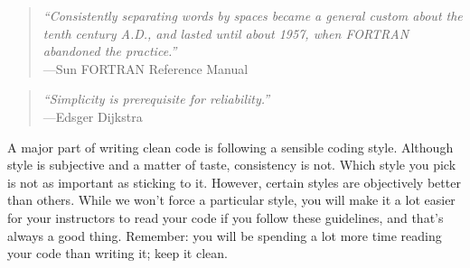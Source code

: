 \label{chap:Coding style}

\begin{quote}\small
  \emph{``Consistently separating words by spaces became a general custom about the tenth century A.D., and lasted until about 1957, when FORTRAN abandoned the practice.''} \\ \hspace*{\fill}---Sun FORTRAN Reference Manual
\end{quote}

\begin{quote}\small
  \emph{``Simplicity is prerequisite for reliability.''} \\ \hspace*{\fill}---Edsger Dijkstra
\end{quote}
A major part of writing clean code is following a sensible coding style.
Although style is subjective and a matter of taste, consistency is not.
Which style you pick is not as important as sticking to it.
However, certain styles are objectively better than others.
While we won't force a particular style, you will make it a lot easier for your instructors to read your code if you follow these guidelines, and that's always a good thing.
Remember: you will be spending a lot more time reading your code than writing it; keep it clean.
